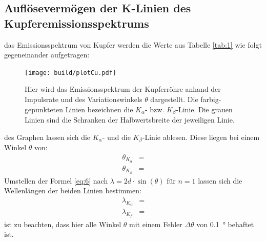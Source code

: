 \subsection{Auflösevermögen der K-Linien des Kupferemissionsspektrums}

    \justifying das Emissionsspektrum von Kupfer werden die Werte aus Tabelle \ref{tab:1} wie folgt gegeneinander aufgetragen:

    \begin{figure}[H]
        \centering
        \texttt{[image: build/plotCu.pdf]}
        \caption{Hier wird das Emissionsspektrum der Kupferröhre anhand der Impulsrate und des Variationswinkels $\theta$ dargestellt. Die farbig-
        gepunkteten Linien bezeichnen die $K_{\alpha}$- bzw. $K_{\beta}$-Linie. Die grauen Linien sind die Schranken der Halbwertsbreite
        der jeweiligen Linie.}
        \label{fig:3}
    \end{figure}

    \justifying des Graphen lassen sich die $K_{\alpha}$- und die $K_{\beta}$-Linie ablesen. Diese liegen bei einem
    Winkel $\theta$ von:
    \begin{subequations}\label{eq:11}
    \begin{align}
        \theta_{K_{\alpha}} &= \text{} \label{eq:11a}\\
        \theta_{K_{\beta}} &= \text{} \label{eq:11b}
    \end{align}
    \end{subequations}
    \justifying Umstellen der Formel \eqref{eq:6} nach $\lambda = 2d\cdot\sin(\theta)$ für $n=1$ lassen sich die Wellenlängen 
    der beiden Linien bestimmen: 
    \begin{subequations}\label{eq:12}
    \begin{align}
        \lambda_{K_{\alpha}} &= \text{} \label{eq:12a}\\
        \lambda_{K_{\beta}} &= \text{} \label{eq:12b}
    \end{align}
    \end{subequations}
    \justifying ist zu beachten, dass hier alle Winkel $\theta$ mit einem Fehler $\Delta \theta$ von \SI{0.1}{\degree} behaftet ist.
    
